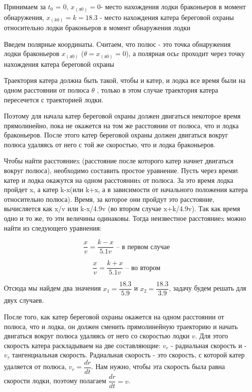 \documentclass[
  12pt,
  a4paper,
  DIV=11,
  numbers=noendperiod]{scrreprt}
\begin{document}
Принимаем за \(t_0\) = 0, \(x_(л0) = 0\)- место нахождения лодки
браконьеров в момент обнаружения, \(x_(k0) = k = 18.3\) - место
нахождения катера береговой охраны относительно лодки браконьеров в
момент обнаружения лодки

Введем полярные координаты. Считаем, что полюс - это точка обнаружения
лодки браконьеров \(x_(л0)\) (\(\theta = x_(л0) = 0\)), а полярная осьr
проходит через точку нахождения катера береговой охраны

Траектория катера должна быть такой, чтобы и катер, и лодка все время
были на одном расстоянии от полюса \(\theta\) , только в этом случае
траектория катера пересечется с траекторией лодки.

Поэтому для начала катер береговой охраны должен двигаться некоторое
время прямолинейно, пока не окажется на том же расстоянии от полюса, что
и лодка браконьеров. После этого катер береговой охраны должен двигаться
вокруг полюса удаляясь от него с той же скоростью, что и лодка
браконьеров.

Чтобы найти расстояниеx (расстояние после которого катер начнет
двигаться вокруг полюса), необходимо составить простое уравнение. Пусть
через времяt катер и лодка окажутся на одном расстоянииx от полюса. За
это время лодка пройдет x, а катер k-x(или k+x, а в зависимости от
начального положения катера относительно полюса). Время, за которое они
пройдут это расстояние, вычисляется как x/v или k-x/4.9v (во втором
случае x+k/4.9v). Так как время одно и то же, то эти величины одинаковы.
Тогда неизвестное расстояниеx можно найти из следующего уравнения:

\[
\dfrac{x}{v} = \dfrac{k-x}{5.1v} \text{ -- в первом случае}
\]

\[
\dfrac{x}{v} = \dfrac{k+x}{5.1v} \text{ -- во втором}
\]

Отсюда мы найдем два значения \(x_1 = \dfrac{18.3}{5.9}\) и
\(x_2 = \dfrac{18.3}{3.9}\), задачу будем решать для двух случаев.

После того, как катер береговой охраны окажется на одном расстоянии от
полюса, что и лодка, он должен сменить прямолинейную траекторию и начать
двигаться вокруг полюса удаляясь от него со скоростью лодки \(v\). Для
этого скорость катера раскладываем на две составляющие: \(v_{r}\) -
радиальная скорость и - \(v_{\tau}\) тангенциальная скорость. Радиальная
скорость - это скорость, с которой катер удаляется от полюса,
\(v_r = \dfrac{dr}{dt}\). Нам нужно, чтобы эта скорость была равна
скорости лодки, поэтому полагаем \(\dfrac{dr}{dt} = v\).
\end{document}
